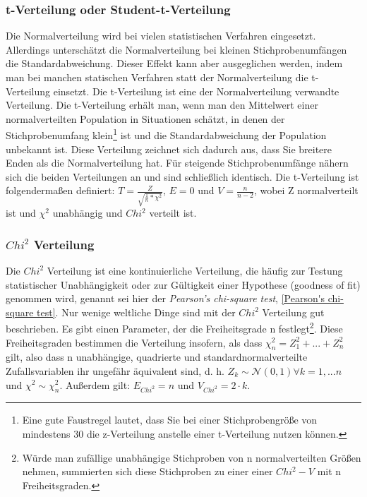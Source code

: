 \documentclass[letterpaper, titlepage]{article}
\begin{document}
\subsubsection{t-Verteilung oder Student-t-Verteilung}\label{t-Verteilung oder Student-t-Verteilung}
Die Normalverteilung wird bei vielen statistischen Verfahren eingesetzt. Allerdings unterschätzt die Normalverteilung bei kleinen Stichprobenumfängen die Standardabweichung. Dieser Effekt kann aber ausgeglichen werden, indem man bei manchen statischen Verfahren statt der Normalverteilung die t-Verteilung einsetzt. Die t-Verteilung ist eine der Normalverteilung verwandte Verteilung. Die t-Verteilung erhält man, wenn man den Mittelwert einer normalverteilten Population in Situationen schätzt, in denen der Stichprobenumfang klein\footnote{Eine gute Faustregel lautet, dass Sie bei einer Stichprobengröße von mindestens 30 die z-Verteilung anstelle einer t-Verteilung nutzen können.} ist und die Standardabweichung der Population unbekannt ist. Diese Verteilung zeichnet sich dadurch aus, dass Sie breitere Enden als die Normalverteilung hat. Für steigende Stichprobenumfänge nähern sich die beiden Verteilungen an und sind schließlich identisch. Die t-Verteilung ist folgendermaßen definiert: $T=\frac{Z}{\sqrt{\frac{1}{n}*\chi^2}}$, $E=0$ und $V=\frac{n}{n-2}$, wobei Z normalverteilt ist und $\chi^2$ unabhängig und \textit{$Chi^2$} verteilt ist.

\subsubsection{\textbf{$Chi^2$} Verteilung}\label{Chi Quadrat Verteilung}
Die $Chi^2$ Verteilung ist eine kontinuierliche Verteilung, die häufig zur Testung statistischer Unabhängigkeit oder zur Gültigkeit einer Hypothese (goodness of fit) genommen wird, genannt sei hier der \textit{Pearson's chi-square test}, \ref{Pearson's chi-square test}. Nur wenige weltliche Dinge sind mit der $Chi^2$ Verteilung gut beschrieben. Es gibt einen Parameter, der die Freiheitsgrade n festlegt\footnote{Würde man zufällige unabhängige Stichproben von n normalverteilten Größen nehmen, summierten sich diese Stichproben zu einer einer $Chi^2-V$ mit n Freiheitsgraden.}. Diese Freiheitsgraden bestimmen die Verteilung insofern, als dass $\chi_n^2=Z_1^2+...+Z_n^2$ gilt, also dass n unabhängige, quadrierte und standardnormalverteilte Zufallsvariablen ihr ungefähr äquivalent sind, d. h. $Z_k\sim \mathcal{N} (0,1) \forall k=1,...n$ und $\chi^2\sim\chi_n^2$. Außerdem gilt: $E_{Chi^2}=n$ und $V_{Chi^2}=2\cdot k$. 
\end{document}
